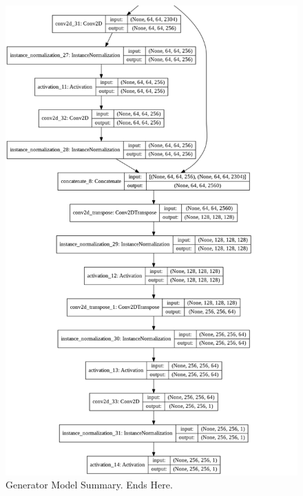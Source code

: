 \begin{figure}[H]
        \vspace*{1cm}
	    \begin{center} 
	    \includegraphics[scale=0.50]{images/Appendix/generator_6.png}
	    \caption{Generator Model Summary. Ends Here.}
	    \end{center}
\end{figure}


